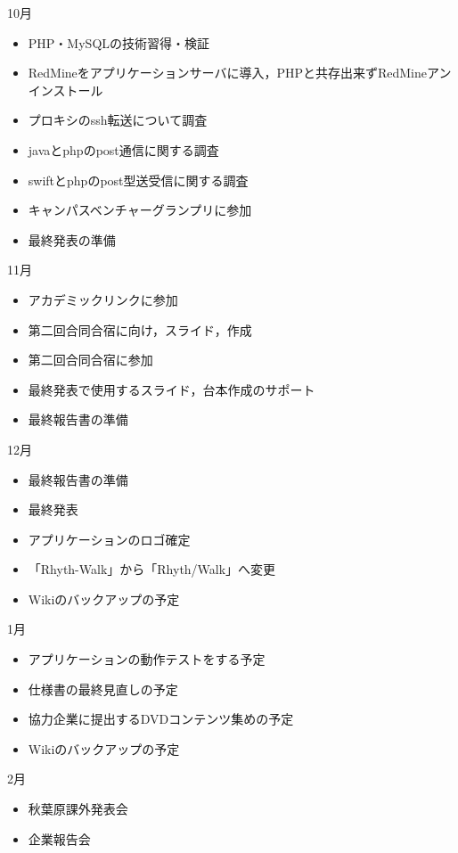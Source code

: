 10月
\begin{itemize}
\item PHP・MySQLの技術習得・検証
\item RedMineをアプリケーションサーバに導入，PHPと共存出来ずRedMineアンインストール
\item プロキシのssh転送について調査
\item javaとphpのpost通信に関する調査
\item swiftとphpのpost型送受信に関する調査
\item キャンパスベンチャーグランプリに参加
\item 最終発表の準備
\end{itemize}
11月
\begin{itemize}
\item アカデミックリンクに参加
\item 第二回合同合宿に向け，スライド，作成
\item 第二回合同合宿に参加
\item 最終発表で使用するスライド，台本作成のサポート
\item 最終報告書の準備
\end{itemize}
12月
\begin{itemize}
\item 最終報告書の準備
\item 最終発表
\item アプリケーションのロゴ確定
\item 「Rhyth-Walk」から「Rhyth/Walk」へ変更
\item Wikiのバックアップの予定
\end{itemize}
1月
\begin{itemize}
\item アプリケーションの動作テストをする予定
\item 仕様書の最終見直しの予定
\item 協力企業に提出するDVDコンテンツ集めの予定
\item Wikiのバックアップの予定
\end{itemize}
2月
\begin{itemize}
\item 秋葉原課外発表会
\item 企業報告会
\end{itemize}


